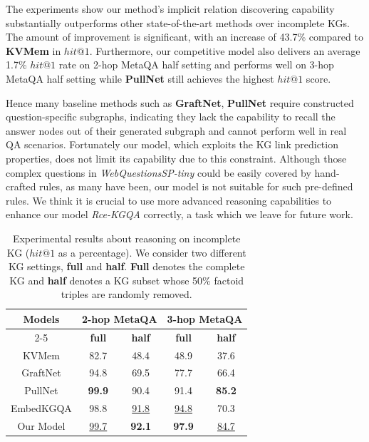 \documentclass[pdflatex,sn-mathphys]{sn-jnl}%
\theoremstyle{thmstyleone}%
\theoremstyle{thmstyletwo}%
\theoremstyle{thmstylethree}%
\begin{document}
The experiments show our method's implicit relation discovering capability substantially outperforms other state-of-the-art methods  over incomplete KGs. The amount of improvement is significant, with  an increase of 43.7\% compared to \textbf{KVMem} in $hit@1$. Furthermore, our competitive model also delivers an average 1.7\% $hit@1$ rate on 2-hop MetaQA half setting and performs well on 3-hop MetaQA half setting while \textbf{PullNet} still achieves the highest $hit@1$ score.

Hence many baseline methods such as \textbf{GraftNet}, \textbf{PullNet} require constructed question-specific subgraphs, indicating they lack the capability to recall the answer nodes out of their generated subgraph and cannot perform well in real QA scenarios. Fortunately our model, which exploits the KG link prediction properties, does not limit its capability due to this constraint. Although those complex questions in \textit{WebQuestionsSP-tiny} could be easily covered by hand-crafted rules, as many have been, our model is not suitable for such pre-defined rules. We think it is crucial to use more advanced reasoning capabilities to enhance our model \textit{Rce-KGQA} correctly, a task which we leave for future work.

\begin{table}[h]
    \centering
    \begin{tabular}{c|c|c|c|c} \hline
        \multirow{2}{*}{Models} & \multicolumn{2}{c}{2-hop MetaQA} & \multicolumn{2}{c}{3-hop MetaQA}\\ \cline{2-5}
         & \textbf{full} & \textbf{half} & \textbf{full} & \textbf{half} \\ \hline
        KVMem & 82.7 & 48.4 & 48.9 & 37.6 \\
        GraftNet & 94.8 & 69.5 & 77.7 & 66.4 \\
        PullNet & \bf{99.9} & 90.4 & 91.4 & \bf{85.2} \\
        EmbedKGQA & 98.8 & \underline{91.8} & \underline{94.8} & 70.3 \\ \hline
        Our Model  & \underline{99.7} & \bf{92.1} & \bf{97.9} & \underline{84.7} \\ \hline
    \end{tabular}
    \caption{Experimental results about reasoning on incomplete KG ($hit@1$ as a percentage). We consider two different KG settings, \textbf{full} and \textbf{half}. \textbf{Full} denotes the complete KG and \textbf{half} denotes a KG subset whose 50\% factoid triples are randomly removed.}
    \label{comparison_full_half}
\end{table}
\end{document}
